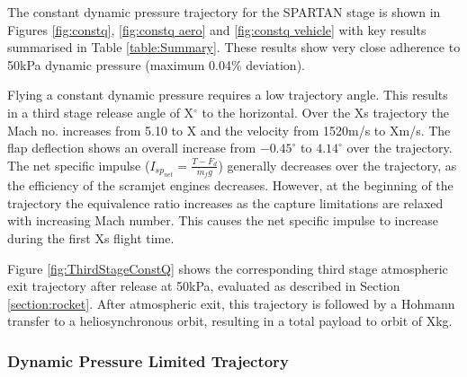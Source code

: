 \documentclass[]{aiaa-tc}
\newcommand{\PayloadToOrbitConstq}{X}
\newcommand{\SeparationvConstq}{X}
\newcommand{\SeparationAngleConstq}{X}
\newcommand{\FlightTimeConstq}{X}
\begin{document}
 The constant dynamic pressure trajectory for the SPARTAN stage is shown in Figures \ref{fig:constq}, \ref{fig:constq aero} and \ref{fig:constq vehicle} with key results summarised in Table \ref{table:Summary}. 
 These results show very close adherence to 50kPa dynamic pressure (maximum 0.04\% deviation). 

 Flying a constant dynamic pressure requires a low trajectory angle. This results in a third stage release angle of \SeparationAngleConstq$^\circ$ to the horizontal. Over the \FlightTimeConstq s trajectory the Mach no. increases from 5.10 to X and the velocity from 1520m/s to \SeparationvConstq m/s. The flap deflection shows an overall increase from $-0.45^\circ$ to $4.14^\circ$ over the trajectory.  The net specific impulse ($I_{sp_{net}} = \frac{T-F_d}{\dot{m}_f g}$) generally decreases over the trajectory, as the efficiency of the scramjet engines decreases. However, at the beginning of the trajectory the equivalence ratio increases as the capture limitations are relaxed with increasing Mach number. This causes the net specific impulse to increase during the first Xs flight time. 

Figure \ref{fig:ThirdStageConstQ} shows the corresponding third stage atmospheric exit trajectory after release at 50kPa, evaluated as described in Section \ref{section:rocket}. After atmospheric exit, this trajectory is followed by a Hohmann transfer to a heliosynchronous orbit, resulting in a total payload to orbit of \PayloadToOrbitConstq kg.



\subsubsection{Dynamic Pressure Limited Trajectory} \label{subsection:50kPalimit}
\end{document}
